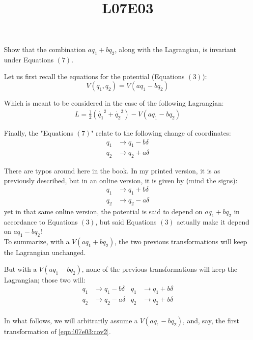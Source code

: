 \documentclass[solutions.tex]{subfiles}
\title{L07E03}
\begin{document}
\maketitle
\begin{exercise}
Show that the combination $a q_1 + b q_2$, along with the Lagrangian,
is invariant under Equations $(7)$.
\end{exercise}
Let us first recall the equations for the potential (Equations $(3)$):
\[
	V(q_1, q_2) = V(a q_1 - b q_2)
\]

Which is meant to be considered in the case of the following
Lagrangian:
\begin{align}
	L = \frac{1}{2}(\dot{q_1}^2+\dot{q_2}^2) - V(a q_1-b q_2)
	\label{eqn:l07e03:lagrangian}
\end{align}

Finally, the "Equations $(7)$" relate to the following change of
coordinates:
\begin{align}
	q_1 &\rightarrow q_1 - b\delta \nonumber\\
	q_2 &\rightarrow q_2 + a\delta
	\label{eqn:l07e03:cov}
\end{align}

\begin{remark} There are typos around here in the book. In my printed
version, it is as previously described, but in an online version, it is given
by (mind the signs):
\begin{align*}
	q_1 &\rightarrow q_1 + b\delta \nonumber\\
	q_2 &\rightarrow q_2 - a\delta
\end{align*}
yet in that same online version, the potential is said to depend on $a q_1 + b q_2$
in accordance to Equations $(3)$, but said Equations $(3)$ actually make
it depend on $a q_1 - b q_2$! \\

To summarize, with a $V(a q_1 + b q_2)$, the two previous transformations
will keep the Lagrangian unchanged.

But with a $V(a q_1 - b q_2)$, none of the previous transformations will keep
the Lagrangian; those two will:
\begin{align}
	q_1 &\rightarrow q_1 - b\delta
	& q_1 &\rightarrow q_1 + b\delta \nonumber\\
	q_2 &\rightarrow q_2 - a\delta
	& q_2 &\rightarrow q_2 + b\delta \nonumber\\
	\label{eqn:l07e03:cov2}
\end{align}

In what follows, we will arbitrarily assume a $V(a q_1 - b q_2)$, and,
say, the first transformation of \eqref{eqn:l07e03:cov2}.
\end{remark}
\end{document}
